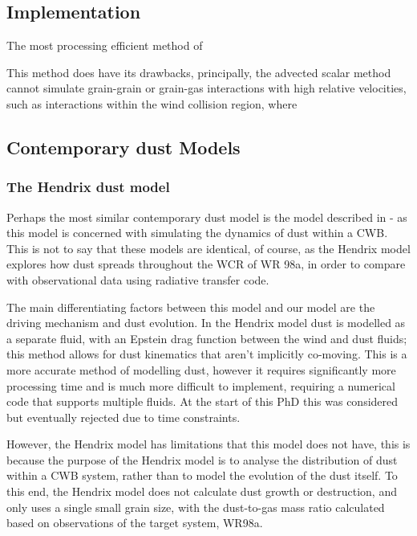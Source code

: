 \subsection{Implementation}

The most processing efficient method of 


This method does have its drawbacks, principally, the advected scalar method cannot simulate grain-grain or grain-gas interactions with high relative velocities, such as interactions within the wind collision region, where 

\subsection{Contemporary dust Models}



\subsubsection{The Hendrix dust model}

Perhaps the most similar contemporary dust model is the model described in \cite{hendrix_pinwheels_2016} - as this model is concerned with simulating the dynamics of dust within a CWB.
This is not to say that these models are identical, of course, as the Hendrix model explores how dust spreads throughout the WCR of WR 98a, in order to compare with observational data using radiative transfer code.


The main differentiating factors between this model and our model are the driving mechanism and dust evolution.
In the Hendrix model dust is modelled as a separate fluid, with an Epstein drag function between the wind and dust fluids; this method allows for dust kinematics that aren't implicitly co-moving.
This is a more accurate method of modelling dust, however it requires significantly more processing time and is much more difficult to implement, requiring a numerical code that supports multiple fluids.
At the start of this PhD this was considered but eventually rejected due to time constraints.

However, the Hendrix model has limitations that this model does not have, this is because the purpose of the Hendrix model is to analyse the distribution of dust within a CWB system, rather than to model the evolution of the dust itself.
To this end, the Hendrix model does not calculate dust growth or destruction, and only uses a single small grain size, with the dust-to-gas mass ratio calculated based on observations of the target system, WR98a.



